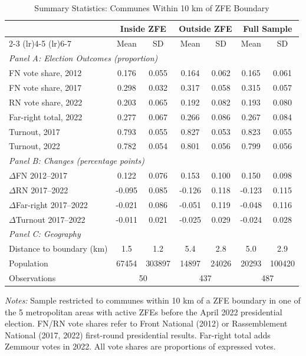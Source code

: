 \begin{table}[H]
\centering
\caption{Summary Statistics: Communes Within 10 km of ZFE Boundary}
\label{tab:summary}
\begin{threeparttable}
\begin{tabular}{lcccccc}
\toprule
 & \multicolumn{2}{c}{Inside ZFE} & \multicolumn{2}{c}{Outside ZFE} & \multicolumn{2}{c}{Full Sample} \\
\cmidrule(lr){2-3} \cmidrule(lr){4-5} \cmidrule(lr){6-7}
 & Mean & SD & Mean & SD & Mean & SD \\
\midrule
\multicolumn{7}{l}{\textit{Panel A: Election Outcomes (proportion)}} \\[3pt]
  FN vote share, 2012 & 0.176 & 0.055 & 0.164 & 0.062 & 0.165 & 0.061 \\
  FN vote share, 2017 & 0.298 & 0.032 & 0.317 & 0.058 & 0.315 & 0.057 \\
  RN vote share, 2022 & 0.203 & 0.065 & 0.192 & 0.082 & 0.193 & 0.080 \\
  Far-right total, 2022 & 0.277 & 0.067 & 0.266 & 0.086 & 0.267 & 0.084 \\
  Turnout, 2017 & 0.793 & 0.055 & 0.827 & 0.053 & 0.823 & 0.055 \\
  Turnout, 2022 & 0.782 & 0.054 & 0.801 & 0.056 & 0.799 & 0.056 \\
\midrule
\multicolumn{7}{l}{\textit{Panel B: Changes (percentage points)}} \\[3pt]
  $\Delta$FN 2012--2017 & 0.122 & 0.076 & 0.153 & 0.100 & 0.150 & 0.098 \\
  $\Delta$RN 2017--2022 & -0.095 & 0.085 & -0.126 & 0.118 & -0.123 & 0.115 \\
  $\Delta$Far-right 2017--2022 & -0.021 & 0.086 & -0.051 & 0.119 & -0.048 & 0.116 \\
  $\Delta$Turnout 2017--2022 & -0.011 & 0.021 & -0.025 & 0.029 & -0.024 & 0.028 \\
\midrule
\multicolumn{7}{l}{\textit{Panel C: Geography}} \\[3pt]
  Distance to boundary (km) & 1.5 & 1.2 & 5.4 & 2.8 & 5.0 & 2.9 \\
  Population & 67454 & 303897 & 14897 & 24026 & 20293 & 100420 \\
\midrule
  Observations & \multicolumn{2}{c}{50} & \multicolumn{2}{c}{437} & \multicolumn{2}{c}{487} \\
\bottomrule
\end{tabular}
\begin{tablenotes}[flushleft]
\small
\item \textit{Notes:} Sample restricted to communes within 10 km of a ZFE boundary in one of the 5 metropolitan areas with active ZFEs before the April 2022 presidential election. FN/RN vote shares refer to Front National (2012) or Rassemblement National (2017, 2022) first-round presidential results. Far-right total adds Zemmour votes in 2022. All vote shares are proportions of expressed votes.
\end{tablenotes}
\end{threeparttable}
\end{table}
